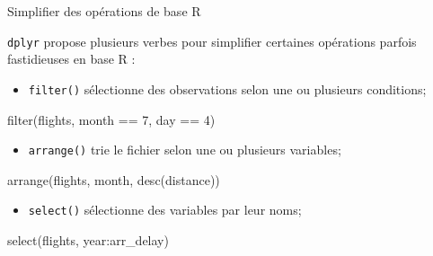 \documentclass[12pt,ignorenonframetext,handout,]{beamer}
\newenvironment{Shaded}{}{}
\newcommand{\DecValTok}[1]{#1}
\newcommand{\KeywordTok}[1]{\textcolor[rgb]{0.00,0.00,1.00}{#1}}
\newcommand{\NormalTok}[1]{#1}
\newcommand{\OperatorTok}[1]{#1}
\newcommand{\StringTok}[1]{\textcolor[rgb]{0.00,0.50,0.50}{#1}}
\providecommand{\tightlist}{%
  \setlength{\itemsep}{0pt}\setlength{\parskip}{0pt}}
\renewenvironment{Shaded}{\begin{snugshade}}{\end{snugshade}}
\begin{document}
\begin{frame}[fragile]{Simplifier des opérations de base R}
\protect\hypertarget{simplifier-des-operations-de-base-r}{}

\texttt{dplyr} propose plusieurs verbes pour simplifier certaines
opérations parfois fastidieuses en base R :

\pause \vspace{-1mm}

\begin{itemize}
\tightlist
\item
  \texttt{filter()} sélectionne des observations selon une ou plusieurs
  conditions;
\end{itemize}

\vspace{-3mm}

\begin{Shaded}
\begin{Highlighting}[]
\KeywordTok{filter}\NormalTok{(flights, month }\OperatorTok{==}\StringTok{ }\DecValTok{7}\NormalTok{, day }\OperatorTok{==}\StringTok{ }\DecValTok{4}\NormalTok{)}
\end{Highlighting}
\end{Shaded}

\pause \vspace{-3mm}

\begin{itemize}
\tightlist
\item
  \texttt{arrange()} trie le fichier selon une ou plusieurs variables;
\end{itemize}

\vspace{-3mm}

\begin{Shaded}
\begin{Highlighting}[]
\KeywordTok{arrange}\NormalTok{(flights, month, }\KeywordTok{desc}\NormalTok{(distance))}
\end{Highlighting}
\end{Shaded}

\pause \vspace{-3mm}

\begin{itemize}
\tightlist
\item
  \texttt{select()} sélectionne des variables par leur noms;
\end{itemize}

\vspace{-3mm}

\begin{Shaded}
\begin{Highlighting}[]
\KeywordTok{select}\NormalTok{(flights, year}\OperatorTok{:}\NormalTok{arr_delay)}
\end{Highlighting}
\end{Shaded}


\end{frame}
\end{document}
